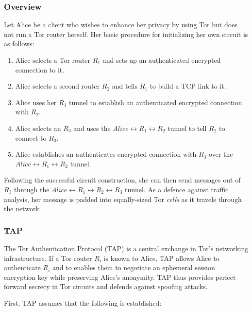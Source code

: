 \subsubsection{Overview}

Let Alice be a client who wishes to enhance her privacy by using Tor but does not run a Tor router herself. Her basic procedure for initializing her own circuit is as follows:

\begin{enumerate}
	\item Alice selects a Tor router $ R_{1} $ and sets up an authenticated encrypted connection to it.
	\item Alice selects a second router $ R_{2} $ and tells $ R_{1} $ to build a TCP link to it. 
	\item Alice uses her $ R_{1} $ tunnel to establish an authenticated encrypted connection with $ R_{2} $.
	\item Alice selects an $ R_{3} $ and uses the $ Alice \leftrightarrow R_{1} \leftrightarrow R_{2} $ tunnel to tell $ R_{2} $ to connect to $ R_{3} $.
	\item Alice establishes an authenticates encrypted connection with $ R_{3} $ over the \\ $ Alice \leftrightarrow R_{1} \leftrightarrow R_{2} $ tunnel.
\end{enumerate}

Following the successful circuit construction, she can then send messages out of $ R_{3} $ through the $ Alice \leftrightarrow R_{1} \leftrightarrow R_{2} \leftrightarrow R_{3} $ tunnel. As a defence against traffic analysis, her message is padded into equally-sized Tor \emph{cells} as it travels through the network.\cite{mccoy2008shining}

\subsubsection{TAP}

The Tor Authentication Protocol (TAP) is a central exchange in Tor's networking infrastructure. If a Tor router $ R_{i} $ is known to Alice, TAP allows Alice to authenticate $ R_{i} $ and to enables them to negotiate an ephemeral session encryption key while preserving Alice's anonymity. TAP thus provides perfect forward secrecy in Tor circuits and defends against spoofing attacks.

First, TAP assumes that the following is established:


